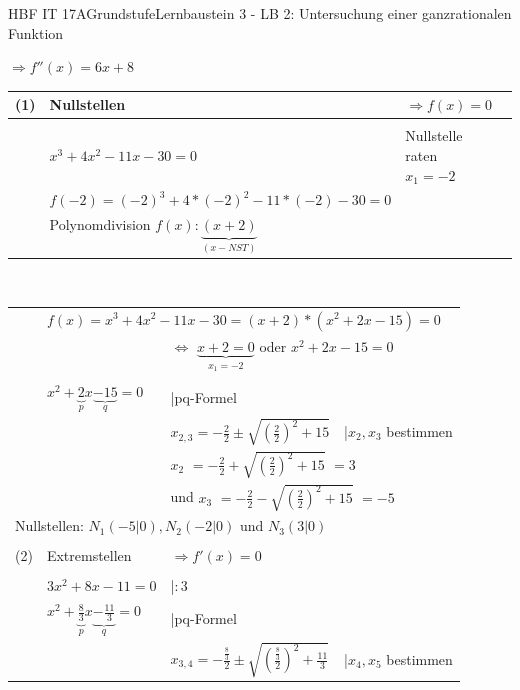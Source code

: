 \documentclass[oneside,openany,headings=optiontotoc,11pt,numbers=noenddot]{scrreprt}
\begin{document}
\begin{worksheet}{HBF IT 17A}{Grundstufe}{Lernbaustein 3 - LB 2: Untersuchung einer ganzrationalen Funktion}
\begin{framed}
			\(\Rightarrow f''(x) = 6x +8\)\\
			\par\noindent
			\begin{tabularx}{\textwidth}{lXXl}
				(1) & Nullstellen & \(\Rightarrow f(x) = 0\)\\
				\hline\\
				& \(x^3 +4x^2-11x-30 = 0\) & Nullstelle raten \colorbox{green!10}{\(x_1 = -2\)}\\
				& \(f(-2) = (-2)^3 +4*(-2)^2-11*(-2)-30 = 0\)\\
				& Polynomdivision \(f(x):\underbrace{(x+2)}_{(x-NST)}\)\\
			\end{tabularx}
			\\
			\begin{tabularx}{\textwidth}{lXXl}
				& \multicolumn{3}{l}{\(f(x) = x^3 +4x^2-11x-30 = (x+2)*(x^2+2x-15) = 0\)}\\
				& & \multicolumn{2}{l}{\(\Leftrightarrow\) \colorbox{green!10}{\(\underbrace{x+2=0}_{x_1=-2}\)} oder \(x^2 +2x-15 = 0\)}\\
				\cline{1-2}\\
				& \(x^2 +\underbrace{2}_{p}x \underbrace{-15}_{q} = 0\) & |pq-Formel\\
				& & \(x_{2,3} = -\frac{2}{2} \pm \sqrt{\left(\frac{2}{2}\right)^2 +15}\) & |\(x_2,x_3\) bestimmen\\
				& & \multicolumn{2}{l}{\colorbox{green!10}{\(x_2\)} \(= -\frac{2}{2} + \sqrt{\left(\frac{2}{2}\right)^2 +15}\) \colorbox{green!10}{\(= 3\)}}\\
				& & \multicolumn{2}{l}{und \colorbox{green!10}{\(x_3\)} \(= -\frac{2}{2} - \sqrt{\left(\frac{2}{2}\right)^2 +15}\) \colorbox{green!10}{\(=-5\)}}\\
				\multicolumn{4}{l}{Nullstellen: \colorbox{blue!5}{\(N_1(-5|0), N_2(-2|0)\)} und \colorbox{blue!5}{\(N_3(3|0)\)}}\\
				\hline\hline\\
				(2) & Extremstellen & \(\Rightarrow f'(x) = 0\)\\
				\hline\\
				& \(3x^2 +8x-11 = 0\) & |\(:3\)\\
				& \(x^2 +\underbrace{\frac{8}{3}}_{p}x \underbrace{-\frac{11}{3}}_{q} = 0\) & |pq-Formel\\
				& & \(x_{3,4} = -\frac{\frac{8}{3}}{2} \pm \sqrt{\left(\frac{\frac{8}{3}}{2}\right)^2 +\frac{11}{3}}\) & |\(x_4,x_5\) bestimmen\\

\end{tabularx}
\end{framed}
\end{worksheet}
\end{document}
